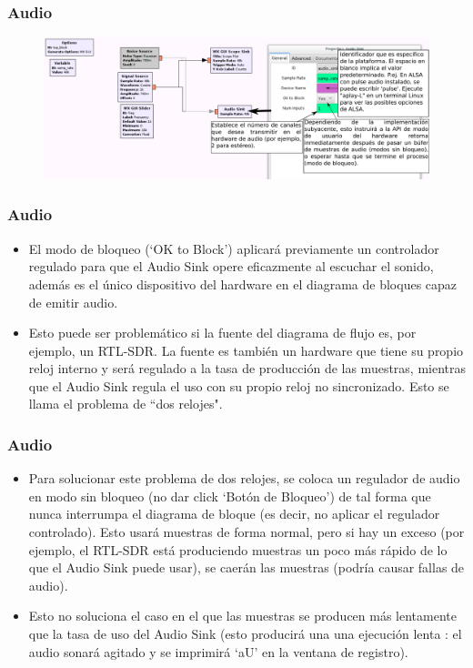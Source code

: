 \begin{frame}[fragile]
\frametitle{Audio}


\begin{figure}

\begin{center}
\includegraphics[width=0.9\paperwidth]{lab3/pdf/lab32.pdf}
\end{center}

\end{figure}
\end{frame}


\begin{frame}
\frametitle{Audio}
\begin{itemize}
    \item El modo de bloqueo (‘OK to Block’) aplicará previamente un
    controlador regulado para que el Audio Sink opere eficazmente
    al escuchar el sonido, además es el único dispositivo del
    hardware en el diagrama de bloques capaz de emitir audio.
    \item Esto puede ser problemático si la fuente del diagrama de flujo
    es, por ejemplo, un RTL-SDR. La fuente es también un
    hardware que tiene su propio reloj interno y será regulado a la
    tasa de producción de las muestras, mientras que el Audio
    Sink regula el uso con su propio reloj no sincronizado. Esto se
    llama el problema de “dos relojes".
\end{itemize}
\end{frame}

\begin{frame}
\frametitle{Audio}
\begin{itemize}
    \item Para solucionar este problema de dos relojes, se coloca un
    regulador de audio en modo sin bloqueo (no dar click ‘Botón
    de Bloqueo’) de tal forma que nunca interrumpa el diagrama
    de bloque (es decir, no aplicar el regulador controlado). Esto
    usará muestras de forma normal, pero si hay un exceso (por
    ejemplo, el RTL-SDR está produciendo muestras un poco más
    rápido de lo que el Audio Sink puede usar), se caerán las
    muestras (podría causar fallas de audio).

    \item Esto no soluciona el caso en el que las muestras se producen
    más lentamente que la tasa de uso del Audio Sink (esto
    producirá una una ejecución lenta : el audio sonará agitado y
    se imprimirá ‘aU’ en la ventana de registro).

\end{itemize}
\end{frame}


